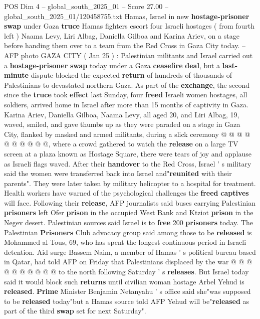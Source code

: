 \begin{textsample}{POS Dim 4 – global\_south\_2025\_01 – Score 27.00 – global\_south\_2025\_01/120458755.txt}  \label{ex:f4_pos_016}
Hamas, Israel in new \textbf{hostage-prisoner} \textbf{swap} under Gaza \textbf{truce} Hamas fighters escort four Israeli hostages ( from fourth left ) Naama Levy, Liri Albag, Daniella Gilboa and Karina Ariev, on a stage before handing them over to a team from the Red Cross in Gaza City today. -- AFP photo GAZA CITY ( Jan 25 ) : Palestinian militants and Israel carried out a \textbf{hostage-prisoner} \textbf{swap} today under a Gaza \textbf{ceasefire} \textbf{deal}, but a \textbf{last-minute} dispute blocked the expected \textbf{return} of hundreds of thousands of Palestinians to devastated northern Gaza.
As part of the \textbf{exchange}, the second since the \textbf{truce} took \textbf{effect} last Sunday, four \textbf{freed} Israeli women hostages, all soldiers, arrived home in Israel after more than 15 months of captivity in Gaza.
Karina Ariev, Daniella Gilboa, Naama Levy, all aged 20, and Liri Albag, 19, waved, smiled, and gave thumbs up as they were paraded on a stage in Gaza City, flanked by masked and armed militants, during a slick ceremony @ @ @ @ @ @ @ @ @ @, where a crowd gathered to watch the \textbf{release} on a large TV screen at a plaza known as Hostage Square, there were tears of joy and applause as Israeli flags waved.
After their \textbf{handover} to the Red Cross, Israel ' s military said the women were transferred back into Israel and"\textbf{reunited} with their parents".
They were later taken by military helicopter to a hospital for treatment.
Health workers have warned of the psychological challenges the \textbf{freed} \textbf{captives} will face.
Following their \textbf{release}, AFP journalists said buses carrying Palestinian \textbf{prisoners} left Ofer \textbf{prison} in the occupied West Bank and Ktziot \textbf{prison} in the Negev desert.
Palestinian sources said Israel is to \textbf{free} 200 \textbf{prisoners} today.
The Palestinian \textbf{Prisoners} Club advocacy group said among those to be \textbf{released} is Mohammed al-Tous, 69, who has spent the longest continuous period in Israeli detention.
Aid surge Bassem Naim, a member of Hamas ' s political bureau based in Qatar, had told AFP on Friday that Palestinians displaced by the war @ @ @ @ @ @ @ @ @ @ to the north following Saturday ' s \textbf{releases}.
But Israel today said it would block such \textbf{returns} until civilian woman hostage Arbel Yehud is \textbf{released}. \textbf{Prime} Minister Benjamin Netanyahu ' s office said she"was supposed to be \textbf{released} today"but a Hamas source told AFP Yehud will be"\textbf{released} as part of the third \textbf{swap} set for next Saturday".

\end{textsample}
